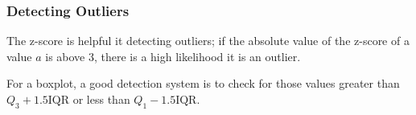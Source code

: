 \documentclass[15pt,a4paper]{book}
\theoremstyle{definition}
\begin{document}
\subsubsection{Detecting Outliers}
The z-score is helpful it detecting outliers; if the absolute value of the z-score of a value $a$ is above 3, there is a high likelihood it is an outlier.

For a boxplot, a good detection system is to check for those values greater than $Q_{3} + 1.5\text{IQR}$ or less than $Q_{1} - 1.5\text{IQR}$.



\end{document}
